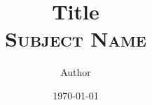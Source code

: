 \documentclass[answers]{exam}
\title{\Huge{Title}
	\\
\Large\scshape{Subject Name}}
\author{Author}
\date{\today}
\begin{document}
\maketitle

\begin{questions}
    
\end{questions}

% 
% 
\end{document}
